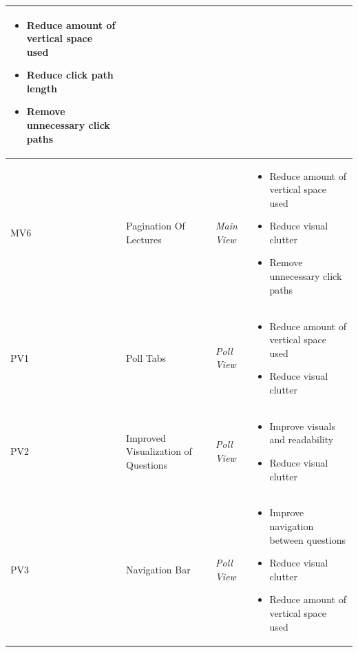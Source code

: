 \begin{longtable}{ | p{0.7cm} | p{2.8cm} | p{2cm} | p{7.6cm} |}
	\vspace{-0.45cm}	
	\begin{itemize}[leftmargin=*,noitemsep, topsep=0pt]
		\item Reduce amount of vertical space used
		\item Reduce click path length
		\item Remove unnecessary click paths
	\end{itemize} \vspace{-0.45cm} \\ \hline
	MV6 & Pagination Of Lectures &\emph{Main View} & 
	\vspace{-0.45cm}	
	\begin{itemize}[leftmargin=*,noitemsep, topsep=0pt]
		\item Reduce amount of vertical space used
		\item Reduce visual clutter
		\item Remove unnecessary click paths
	\end{itemize} \vspace{-0.45cm} \\ \hline
	PV1 & Poll Tabs & \emph{Poll View} &
	\vspace{-0.45cm}	
	\begin{itemize}[leftmargin=*,noitemsep, topsep=0pt]
		\item Reduce amount of vertical space used
		\item Reduce visual clutter
	\end{itemize} \vspace{-0.45cm} \\ \hline
	PV2 & Improved Visualization of Questions & \emph{Poll View} &
	\vspace{-0.45cm}	
	\begin{itemize}[leftmargin=*,noitemsep, topsep=0pt]
		\item Improve visuals and readability
		\item Reduce visual clutter
	\end{itemize} \vspace{-0.45cm} \\ \hline
	PV3 & Navigation Bar & \emph{Poll View} &
	\vspace{-0.45cm}	
	\begin{itemize}[leftmargin=*,noitemsep, topsep=0pt]
		\item Improve navigation between questions
		\item Reduce visual clutter
		\item Reduce amount of vertical space used

\end{itemize}
\end{longtable}
